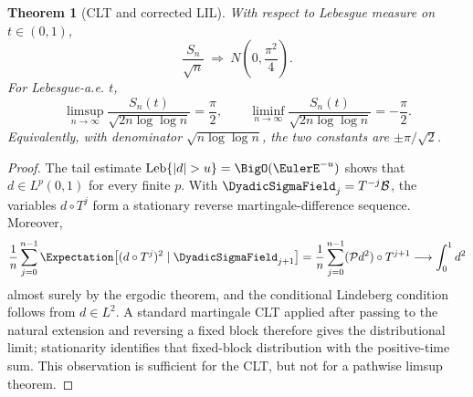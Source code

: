 \documentclass[11pt,oneside]{article}
\numberwithin{equation}{section}
\newtheorem{theorem}{Theorem}[section]
\theoremstyle{definition}
\theoremstyle{remark}
\newcommand{\LebesgueMeasure}{\operatorname{Leb}}
\begin{document}
\begin{theorem}[CLT and corrected LIL]
\label{thm:correct-lil}
With respect to Lebesgue measure on $t\in(0,1)$,
\begin{equation}
 \frac{S_n}{\sqrt n}\ \Longrightarrow\
 N\!\left(0,\frac{\pi^2}{4}\right).
 \label{eq:CLT}
\end{equation}
For Lebesgue-a.e. $t$,
\begin{equation}
 \limsup_{n\to\infty}\frac{S_n(t)}{\sqrt{2n\log\log n}}=\frac\pi2,
 \qquad
 \liminf_{n\to\infty}\frac{S_n(t)}{\sqrt{2n\log\log n}}=-\frac\pi2.
 \label{eq:LIL-correct}
\end{equation}
Equivalently, with denominator $\sqrt{n\log\log n}$, the two constants are
$\pm\pi/\sqrt2$.
\end{theorem}

\begin{proof}
The tail estimate $\LebesgueMeasure\{|d|>u\}=\BigO(\EulerE^{-u})$ shows that
$d\in L^p(0,1)$ for every finite $p$.  With
$\DyadicSigmaField_j=T^{-j}\mathcal B$, the variables $d\circ T^j$ form a stationary reverse
martingale-difference sequence.  Moreover,
\[
 \frac1n\sum_{j=0}^{n-1}
 \Expectation\!\left[(d\circ T^j)^2\mid\DyadicSigmaField_{j+1}\right]
 =\frac1n\sum_{j=0}^{n-1}(\mathcal P d^2)\circ T^{j+1}
 \longrightarrow\int_0^1d^2
\]
almost surely by the ergodic theorem, and the conditional Lindeberg condition follows from
$d\in L^2$.  A standard martingale CLT applied after passing to the natural extension and
reversing a fixed block therefore gives the distributional limit; stationarity identifies
that fixed-block distribution with the positive-time sum.  This observation is sufficient
for the CLT, but not for a pathwise limsup theorem.


\end{proof}
\end{document}
